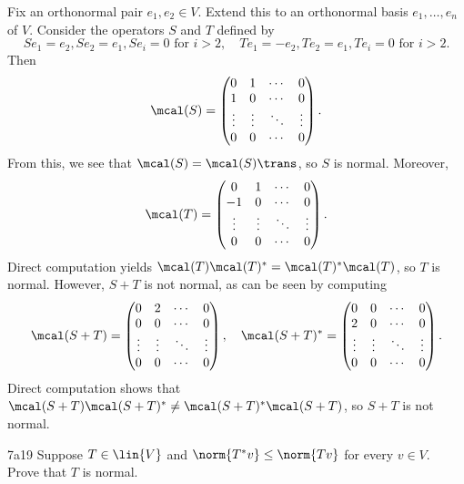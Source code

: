 \begin{sol}
    Fix an orthonormal pair $e_1, e_2 \in V$.
    Extend this to an orthonormal basis $e_1, \ldots, e_n$ of $V$.
    Consider the operators $S$ and $T$ defined by
    \[
        Se_1 = e_2, Se_2 = e_1, Se_i = 0 \text{ for } i > 2, \quad Te_1 = -e_2, Te_2 = e_1, Te_i = 0 \text{ for } i > 2.
    \]
    Then
    \[
        \mcal(S) = 
        \begin{pmatrix}
            0 & 1 & \cdots & 0 \\
            1 & 0 & \cdots & 0 \\
            \vdots & \vdots & \ddots & \vdots \\
            0 & 0 & \cdots & 0
        \end{pmatrix}.
    \]
    From this, we see that $\mcal(S) = \mcal(S)\trans$, so $S$ is normal.
    Moreover,
    \[
        \mcal(T) = 
        \begin{pmatrix}
            0 & 1 & \cdots & 0 \\
            -1 & 0 & \cdots & 0 \\
            \vdots & \vdots & \ddots & \vdots \\
            0 & 0 & \cdots & 0
        \end{pmatrix}.
    \]
    Direct computation yields $\mcal(T)\mcal(T)^\ast = \mcal(T)^\ast\mcal(T)$, so $T$ is normal.
    However, $S + T$ is not normal, as can be seen by computing
    \[
        \mcal(S + T) = 
        \begin{pmatrix}
            0 & 2 & \cdots & 0 \\
            0 & 0 & \cdots & 0 \\
            \vdots & \vdots & \ddots & \vdots \\
            0 & 0 & \cdots & 0
        \end{pmatrix}, \quad
        \mcal(S + T)^\ast = 
        \begin{pmatrix}
            0 & 0 & \cdots & 0 \\
            2 & 0 & \cdots & 0 \\
            \vdots & \vdots & \ddots & \vdots \\
            0 & 0 & \cdots & 0
        \end{pmatrix}.
    \]
    Direct computation shows that $\mcal(S + T)\mcal(S + T)^\ast \neq \mcal(S + T)^\ast\mcal(S + T)$, so $S + T$ is not normal.
\end{sol}

\begin{exercise}{7a19}
    Suppose $T \in \lin{V}$ and $\norm{T^\ast v} \leq \norm{Tv}$ for every $v \in V$.
    Prove that $T$ is normal.

\end{exercise}


